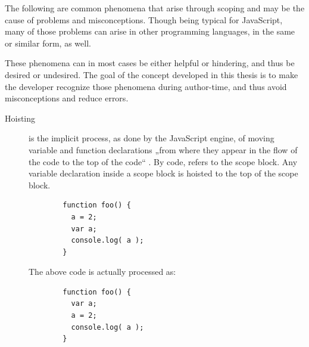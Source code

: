 The following are common phenomena that arise through scoping and may be
the cause of problems and misconceptions. Though being typical for
JavaScript, many of those problems can arise in other programming
languages, in the same or similar form, as well.

These phenomena can in most cases be either helpful or hindering, and
thus be desired or undesired. The goal of the concept developed in this
thesis is to make the developer recognize those phenomena during
author-time, and thus avoid misconceptions and reduce errors.

\begin{description}
\item[Hoisting]
is the implicit process, as done by the JavaScript engine, of moving
variable and function declarations „from where they appear in the flow
of the code to the top of the code“ \cite{getify}. By code,
 refers to the scope block. Any variable declaration
inside a scope block is hoisted to the top of the scope block.

\begin{verbatim}
        function foo() {
          a = 2;
          var a;
          console.log( a );
        }
\end{verbatim}

The above code is actually processed as:

\begin{verbatim}
        function foo() {
          var a;
          a = 2;
          console.log( a );
        }
\end{verbatim}


\end{description}
